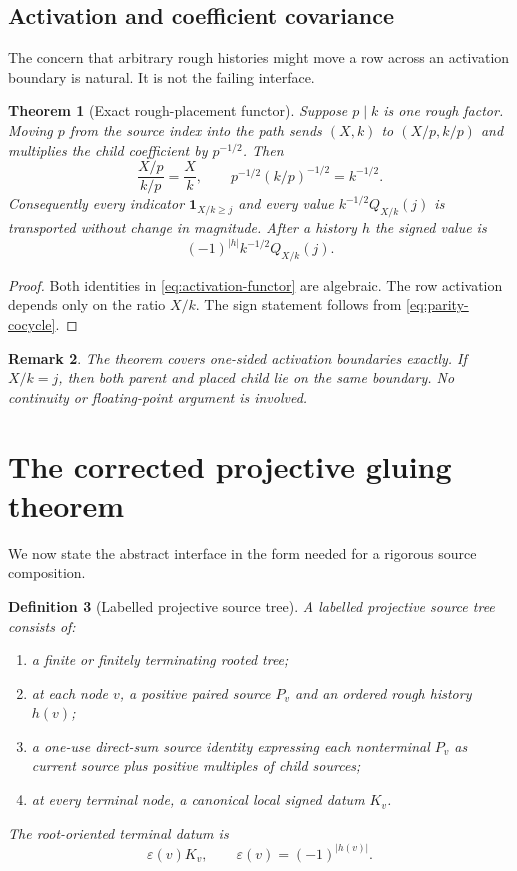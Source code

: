 \documentclass[11pt]{article}
\newtheorem{theorem}{Theorem}[section]
\newtheorem{definition}[theorem]{Definition}
\newtheorem{remark}[theorem]{Remark}
\newcommand{\1}{\mathbf 1}
\newcommand{\eps}{\varepsilon}
\begin{document}
\subsection{Activation and coefficient covariance}

The concern that arbitrary rough histories might move a row across an activation
boundary is natural.  It is not the failing interface.

\begin{theorem}[Exact rough-placement functor]
\label{thm:activation}
Suppose $p\mid k$ is one rough factor.  Moving $p$ from the source index into
the path sends $(X,k)$ to $(X/p,k/p)$ and multiplies the child coefficient by
$p^{-1/2}$.  Then
\begin{equation}
 \frac{X/p}{k/p}=\frac Xk,
 \qquad
 p^{-1/2}(k/p)^{-1/2}=k^{-1/2}.
 \label{eq:activation-functor}
\end{equation}
Consequently every indicator $\1_{X/k\ge j}$ and every value
$k^{-1/2}Q_{X/k}(j)$ is transported without change in magnitude.  After a
history $h$ the signed value is
\begin{equation}
 (-1)^{|h|}k^{-1/2}Q_{X/k}(j).
 \label{eq:history-signed-row}
\end{equation}
\end{theorem}

\begin{proof}
Both identities in \eqref{eq:activation-functor} are algebraic.  The row
activation depends only on the ratio $X/k$.  The sign statement follows from
\eqref{eq:parity-cocycle}.
\end{proof}

\begin{remark}
The theorem covers one-sided activation boundaries exactly.  If $X/k=j$, then
both parent and placed child lie on the same boundary.  No continuity or
floating-point argument is involved.
\end{remark}

\section{The corrected projective gluing theorem}

We now state the abstract interface in the form needed for a rigorous source
composition.

\begin{definition}[Labelled projective source tree]
A labelled projective source tree consists of:
\begin{enumerate}[label=(\alph*)]
\item a finite or finitely terminating rooted tree;
\item at each node $v$, a positive paired source $P_v$ and an ordered rough
history $h(v)$;
\item a one-use direct-sum source identity expressing each nonterminal $P_v$ as
current source plus positive multiples of child sources;
\item at every terminal node, a canonical local signed datum $K_v$.
\end{enumerate}
The root-oriented terminal datum is
\[
 \eps(v)K_v,
 \qquad \eps(v)=(-1)^{|h(v)|}.
\]
\end{definition}
\end{document}
